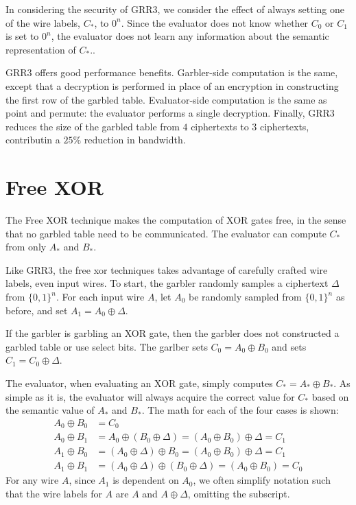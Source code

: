 In considering the security of GRR3, we consider the effect of always setting one of the wire labels, $C_*$, to $0^n$.
Since the evaluator does not know whether $C_0$ or $C_1$ is set to $0^n$, the evaluator does not learn any information about the semantic representation of $C_*$..

GRR3 offers good performance benefits.
Garbler-side computation is the same, except that a decryption is performed in place of an encryption in constructing the first row of the garbled table.
Evaluator-side computation is the same as point and permute: the evaluator performs a single decryption.
Finally, GRR3 reduces the size of the garbled table from $4$ ciphertexts to $3$ ciphertexts, contributin a $25\%$ reduction in bandwidth.

\section{Free XOR}
The Free XOR technique makes the computation of XOR gates free, in the sense that no garbled table need to be communicated.
The evaluator can compute $C_*$ from only $A_*$ and $B_*$.

Like GRR3, the free xor techniques takes advantage of carefully crafted wire labels, even input wires.
To start, the garbler randomly samples a ciphertext $\Delta$ from $\{0,1\}^n$.
For each input wire $A$, let $A_0$ be randomly sampled from $\{0,1\}^n$ as before, and set $A_1 = A_0 \oplus \Delta$.

If the garbler is garbling an XOR gate, then the garbler does not constructed a garbled table or use select bits.
The garlber sets $C_0 = A_0 \oplus B_0$ and sets $C_1 = C_0 \oplus \Delta$.

The evaluator, when evaluating an XOR gate, simply computes $C_* = A_* \oplus B_*$.
As simple as it is, the evaluator will always acquire the correct value for $C_*$ based on the semantic value of $A_*$ and $B_*$.
The math for each of the four cases is shown:
\begin{align}
    A_0 \oplus B_0 & = C_0 \\
    A_0 \oplus B_1 & = A_0 \oplus (B_0 \oplus \Delta) = (A_0 \oplus B_0) \oplus \Delta = C_1 \\
    A_1 \oplus B_0 & = (A_0 \oplus \Delta) \oplus B_0 = (A_0 \oplus B_0) \oplus \Delta = C_1 \\
    A_1 \oplus B_1 & = (A_0 \oplus \Delta) \oplus (B_0 \oplus \Delta) = (A_0 \oplus B_0) = C_0
\end{align}
For any wire $A$, since $A_1$ is dependent on $A_0$, we often simplify notation such that the wire labels for $A$ are $A$ and $A \oplus \Delta$, omitting the subscript.

